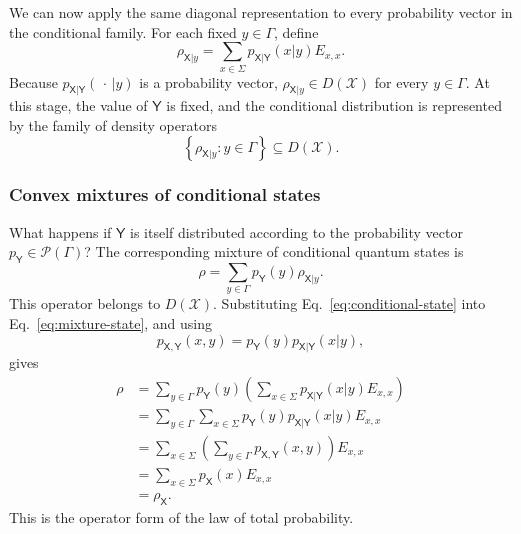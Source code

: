 \documentclass[
    aps,
    pra,
    reprint,
    superscriptaddress,
    nofootinbib
]{revtex4-2}
\theoremstyle{definition}
\theoremstyle{plain}
\begin{document}
We can now apply the same diagonal representation to every probability
vector in the conditional family. For each fixed $y\in\Gamma$, define
\begin{equation}
    \rho_{\mathsf{X}|y}
    =
    \sum_{x\in\Sigma}
    p_{\mathsf{X}|\mathsf{Y}}(x|y)E_{x,x}.
    \label{eq:conditional-state}
\end{equation}
Because $p_{\mathsf{X}|\mathsf{Y}}(\,\cdot\,|y)$ is a probability vector,
$\rho_{\mathsf{X}|y}\in D(\mathcal{X})$ for every $y\in\Gamma$. At this
stage, the value of $\mathsf{Y}$ is fixed, and the conditional distribution
is represented by the family of density operators
\begin{equation}
    \left\{
        \rho_{\mathsf{X}|y}:y\in\Gamma
    \right\}
    \subseteq D(\mathcal{X}).
\end{equation}

\subsubsection{Convex mixtures of conditional states}

What happens if $\mathsf{Y}$ is itself distributed according to the
probability vector $p_{\mathsf{Y}}\in\mathcal{P}(\Gamma)$? The corresponding
mixture of conditional quantum states is
\begin{equation}
    \rho
    =
    \sum_{y\in\Gamma}
    p_{\mathsf{Y}}(y)\rho_{\mathsf{X}|y}.
    \label{eq:mixture-state}
\end{equation}
This operator belongs to $D(\mathcal{X})$. Substituting
Eq.~\eqref{eq:conditional-state} into Eq.~\eqref{eq:mixture-state}, and
using
\begin{equation}
    p_{\mathsf{X},\mathsf{Y}}(x,y)
    =
    p_{\mathsf{Y}}(y)
    p_{\mathsf{X}|\mathsf{Y}}(x|y),
\end{equation}
gives
\begin{align}
    \rho
    &=
    \sum_{y\in\Gamma}
    p_{\mathsf{Y}}(y)
    \left(
        \sum_{x\in\Sigma}
        p_{\mathsf{X}|\mathsf{Y}}(x|y)E_{x,x}
    \right)\\
    &=
    \sum_{y\in\Gamma}\sum_{x\in\Sigma}
    p_{\mathsf{Y}}(y)
    p_{\mathsf{X}|\mathsf{Y}}(x|y)E_{x,x}\\
    &=
    \sum_{x\in\Sigma}
    \left(
        \sum_{y\in\Gamma}
        p_{\mathsf{X},\mathsf{Y}}(x,y)
    \right)E_{x,x}\\
    &=
    \sum_{x\in\Sigma}p_{\mathsf{X}}(x)E_{x,x}\\
    &=
    \rho_{\mathsf{X}}.
\end{align}
This is the operator form of the law of total probability.
\end{document}
